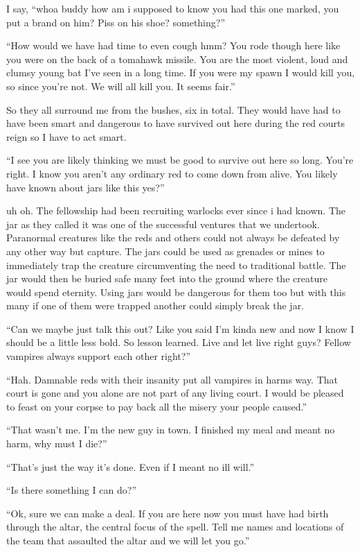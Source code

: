 I say, ``whoa buddy how am i supposed to know you had this one marked, you put a brand on him? Piss on his shoe? something?''

``How would we have had time to even cough hmm? You rode though here like you were on the back of a tomahawk missile. You are the most violent, loud and clumsy young bat I've seen in a long time. If you were my spawn I would kill you, so since you're not. We will all kill you. It seems fair.''

So they all surround me from the bushes, six in total. They would have had to have been smart and dangerous to have survived out here during the red courts reign so I have to act smart.

``I see you are likely thinking we must be good to survive out here so long. You're right. I know you aren't any ordinary red to come down from \chichenitza alive. You likely have known about jars like this yes?''

uh oh. The fellowship had been recruiting warlocks ever since i had known. The jar as they called it was one of the successful ventures that we undertook. Paranormal creatures like the reds and others could not always be defeated by any other way but capture. The jars could be used as grenades or mines to immediately trap the creature circumventing the need to traditional battle. The jar would then be buried safe many feet into the ground where the creature would spend eternity. Using jars would be dangerous for them too but with this many if one of them were trapped another could simply break the jar.

``Can we maybe just talk this out? Like you said I'm kinda new and now I know I should be a little less bold. So lesson learned. Live and let live right guys? Fellow vampires always support each other right?''

``Hah. Damnable reds with their insanity put all vampires in harms way. That court is gone and you alone are not part of any living court. I would be pleased to feast on your corpse to pay back all the misery your people caused.''

``That wasn't me. I'm the new guy in town. I finished my meal and meant no harm, why must I die?''

``That's just the way it's done. Even if I meant no ill will.''

``Is there something I can do?''

``Ok, sure we can make a deal. If you are here now you must have had birth through the altar, the central focus of the spell. Tell me names and locations of the team that assaulted the altar and we will let you go.''

